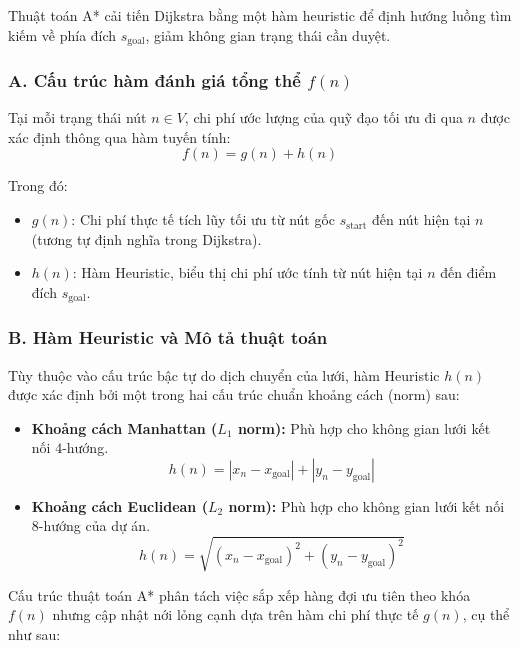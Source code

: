 \documentclass[a4paper, 12pt]{report}
\begin{document}
  Thuật toán A* cải tiến Dijkstra bằng một hàm heuristic để định hướng luồng tìm kiếm về phía đích $s_{\text{goal}}$, giảm không gian trạng thái cần duyệt.

  \subsubsection{A. Cấu trúc hàm đánh giá tổng thể $f(n)$}

  Tại mỗi trạng thái nút $n \in V$, chi phí ước lượng của quỹ đạo tối ưu đi qua $n$ được xác định thông qua hàm tuyến tính:
  \begin{equation}
  f(n) = g(n) + h(n)
  \end{equation}

  Trong đó:
  \begin{itemize}
      \item $g(n)$: Chi phí thực tế tích lũy tối ưu từ nút gốc $s_{\text{start}}$ đến nút hiện tại $n$ (tương tự định nghĩa trong Dijkstra).
      \item $h(n)$: Hàm Heuristic, biểu thị chi phí ước tính từ nút hiện tại $n$ đến điểm đích $s_{\text{goal}}$.
  \end{itemize}

  \subsubsection{B. Hàm Heuristic và Mô tả thuật toán}

  Tùy thuộc vào cấu trúc bậc tự do dịch chuyển của lưới, hàm Heuristic $h(n)$ được xác định bởi một trong hai cấu trúc chuẩn khoảng cách (norm) sau:
  \begin{itemize}
      \item \textbf{Khoảng cách Manhattan ($L_1$ norm):} Phù hợp cho không gian lưới kết nối $4$-hướng.
      $$h(n) = |x_n - x_{\text{goal}}| + |y_n - y_{\text{goal}}|$$
      \item \textbf{Khoảng cách Euclidean ($L_2$ norm):} Phù hợp cho không gian lưới kết nối $8$-hướng của dự án.
      $$h(n) = \sqrt{(x_n - x_{\text{goal}})^2 + (y_n - y_{\text{goal}})^2}$$
  \end{itemize}

  Cấu trúc thuật toán A* phân tách việc sắp xếp hàng đợi ưu tiên theo khóa $f(n)$ nhưng cập nhật nới lỏng cạnh dựa trên hàm chi phí thực tế $g(n)$, cụ thể như sau:
\end{document}
